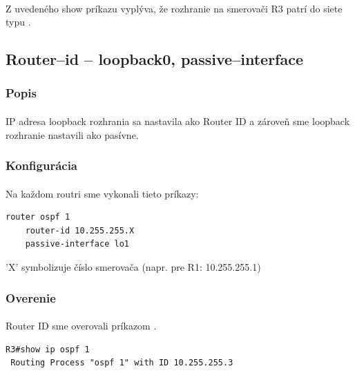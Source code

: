 \documentclass[12pt,twoside,a4paper]{report}
\begin{document}
\paragraph{}
Z uvedeného show príkazu vyplýva, že rozhranie  na smerovači R3 patrí do siete typu .

\subsection{Router–id – loopback0, passive–interface}
\subsubsection{Popis}
\paragraph{}
IP adresa loopback rozhrania sa nastavila ako Router ID a zároveň sme loopback rozhranie  nastavili ako pasívne.

\subsubsection{Konfigurácia}
\paragraph{}
Na každom routri sme vykonali tieto príkazy:
\noindent
{\selectfont

\begin{small}

\begin{verbatim}
router ospf 1
    router-id 10.255.255.X
    passive-interface lo1
\end{verbatim}
\end{small}
}


'X' symbolizuje číslo smerovača (napr. pre R1: 10.255.255.1)

\subsubsection{Overenie}
\paragraph{}
Router ID sme overovali príkazom .

\noindent
{\selectfont
\begin{small}
\begin{verbatim}
R3#show ip ospf 1
 Routing Process "ospf 1" with ID 10.255.255.3
\end{verbatim}
\end{small}
}
\end{document}
